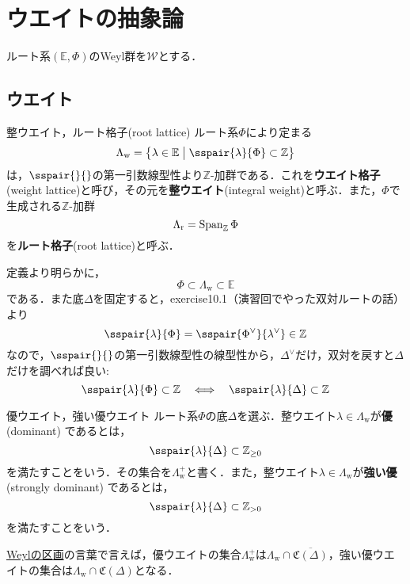 \documentclass[rep_main]{subfiles}
\begin{document}
\section{ウエイトの抽象論}
ルート系$(\mathbb{E}, \Phi)$のWeyl群を$\mathscr{W}$とする．
\subsection{ウエイト}
\begin{mydef}[label=def:root-lattice]{整ウエイト，ルート格子(root lattice)}
	ルート系$\Phi$により定まる
	\begin{equation}
		\Lambda_\text{w} = \bigl\{\lambda \in \mathbb{E} \bigm| \sspair{\lambda}{\Phi} \subset \mathbb{Z} \bigr\}
	\end{equation}
	は，$\sspair{}{}$の第一引数線型性より$\mathbb{Z}$-加群である．これを\textbf{ウエイト格子}(weight lattice)と呼び，その元を\textbf{整ウエイト}(integral weight)と呼ぶ．また，$\Phi$で生成される$\mathbb{Z}$-加群
	\begin{equation}
		\Lambda_\text{r} = \operatorname{Span}_\mathbb{Z}\Phi
	\end{equation}
	を\textbf{ルート格子}(root lattice)と呼ぶ．
\end{mydef}
定義より明らかに，
\begin{equation}
	\Phi \subset \Lambda_\text{w} \subset \mathbb{E}
\end{equation}
である．また底$\Delta$を固定すると，exercise10.1（演習回でやった双対ルートの話）より
\begin{equation}
	\sspair{\lambda}{\Phi} = \sspair{\Phi^\vee}{\lambda^\vee} \in \mathbb{Z}
\end{equation}
なので，$\sspair{}{}$の第一引数線型性の線型性から，$\Delta^\vee$だけ，双対を戻すと$\Delta$だけを調べれば良い:
\begin{equation}
	\sspair{\lambda}{\Phi} \subset \mathbb{Z}  \IFF  \sspair{\lambda}{\Delta} \subset \mathbb{Z}
\end{equation}
\begin{mydef}[label=def:domweight]{優ウエイト，強い優ウエイト}
	ルート系$\Phi$の底$\Delta$を選ぶ．整ウエイト$\lambda \in \Lambda_\text{w}$が\textbf{優} (dominant) であるとは，
	\begin{equation}
		\sspair{\lambda}{\Delta} \subset \mathbb{Z}_{\geq0}
	\end{equation}
	を満たすことをいう．その集合を$\Lambda_\text{w}^+$と書く．また，整ウエイト$\lambda \in \Lambda_\text{w}$が\textbf{強い優} (strongly dominant) であるとは，
	\begin{equation}
		\sspair{\lambda}{\Delta} \subset \mathbb{Z}_{>0}
	\end{equation}
	を満たすことをいう．
\end{mydef}
\hyperref[def:Weylchamber]{Weylの区画}の言葉で言えば，優ウエイトの集合$\Lambda_\text{w}^+$は$\Lambda_\text{w} \cap \overline{\mathfrak{C}(\Delta)}$，強い優ウエイトの集合は$\Lambda_\text{w} \cap \mathfrak{C}(\Delta)$となる．
\end{document}
